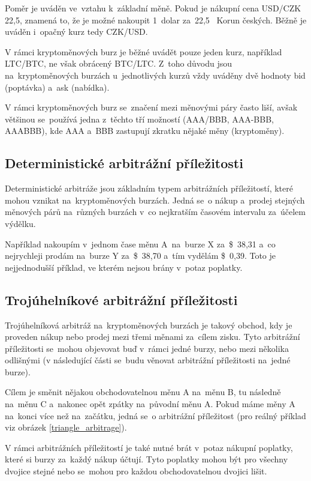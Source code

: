 \documentclass[thesis=B,czech]{FITthesis}[2019/03/21]
\begin{document}
Poměr je uváděn ve~vztahu k~základní měně. Pokud je nákupní cena USD/CZK 22,5, znamená to, že je možné nakoupit 1~dolar za~22,5~ Korun českých. Běžně je uváděn i~opačný kurz tedy CZK/USD. \cite{Capital_menovy_par} 

V rámci kryptoměnových burz je běžné uvádět pouze jeden kurz, například LTC/BTC, ne však obrácený BTC/LTC. Z~toho důvodu jsou na~kryptoměnových burzách u~jednotlivých kurzů vždy uváděny dvě hodnoty bid (poptávka) a~ask (nabídka). 

V rámci kryptoměnových burz se~značení mezi měnovými páry často liší, avšak většinou se~používá jedna z~těchto tří možností (AAA/BBB, AAA-BBB, AAABBB), kde AAA a~BBB zastupují zkratku nějaké měny (kryptoměny).

\subsection{Deterministické arbitrážní příležitosti}
Deterministické arbitráže jsou základním typem arbitrážních příležitostí, které mohou vznikat na~kryptoměnových burzách. Jedná se~o nákup a~prodej \linebreak stejných měnových párů na~různých burzách v~co nejkratším časovém intervalu za~účelem výdělku. \cite{CZInvestor} \cite{TowardsDataScience}

Například nakoupím v~jednom čase měnu A~na~burze X za~\$~38,31 a~co nejrychleji prodám na~burze Y za~\$~38,70 a~tím vydělám  \$~0,39. Toto je nejjednodušší příklad, ve kterém nejsou brány v~potaz poplatky. 

\subsection{Trojúhelníkové arbitrážní příležitosti}
Trojúhelníková arbitráž na~kryptoměnových burzách je takový obchod, kdy je proveden nákup nebo prodej mezi třemi měnami za~cílem zisku. Tyto arbitrážní příležitosti se~mohou objevovat buď v~rámci jedné burzy, nebo mezi několika odlišnými (v následující části se~budu věnovat arbitrážní příležitosti na~jedné burze). \cite{TradingStrategy}

Cílem je směnit nějakou obchodovatelnou měnu A na~měnu B, tu následně na~měnu C a~nakonec opět zpátky na~původní měnu A. Pokud máme měny A na~konci více než na~začátku, jedná se~o arbitrážní příležitost (pro reálný příklad viz obrázek \ref{triangle_arbitrage}).

V rámci arbitrážních příležitostí je také nutné brát v~potaz nákupní poplatky, které si burzy za~každý nákup účtují. Tyto poplatky mohou být pro všechny dvojice stejné nebo se~mohou pro každou obchodovatelnou dvojici lišit.  
\end{document}
